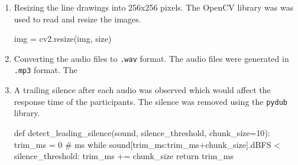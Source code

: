 \documentclass[
  a4paper,
]{article}
\newenvironment{Shaded}{}{}
\newcommand{\AttributeTok}[1]{\textcolor[rgb]{0.84,0.23,0.29}{#1}}
\newcommand{\CommentTok}[1]{\textcolor[rgb]{0.42,0.45,0.49}{#1}}
\newcommand{\ControlFlowTok}[1]{\textcolor[rgb]{0.84,0.23,0.29}{#1}}
\newcommand{\DecValTok}[1]{\textcolor[rgb]{0.00,0.36,0.77}{#1}}
\newcommand{\ExtensionTok}[1]{\textcolor[rgb]{0.84,0.23,0.29}{\textbf{#1}}}
\newcommand{\FunctionTok}[1]{\textcolor[rgb]{0.44,0.26,0.76}{#1}}
\newcommand{\KeywordTok}[1]{\textcolor[rgb]{0.84,0.23,0.29}{#1}}
\newcommand{\NormalTok}[1]{\textcolor[rgb]{0.14,0.16,0.18}{#1}}
\newcommand{\OperatorTok}[1]{\textcolor[rgb]{0.14,0.16,0.18}{#1}}
\newcommand{\PreprocessorTok}[1]{\textcolor[rgb]{0.84,0.23,0.29}{#1}}
\newcommand{\StringTok}[1]{\textcolor[rgb]{0.01,0.18,0.38}{#1}}
\newcommand{\VariableTok}[1]{\textcolor[rgb]{0.89,0.38,0.04}{#1}}
\begin{document}
\begin{enumerate}
\def\labelenumi{\arabic{enumi}.}
\item
  Resizing the line drawings into 256x256 pixels. The OpenCV library was
  was used to read and resize the images.

\begin{Shaded}
\begin{Highlighting}[]
\NormalTok{img }\OperatorTok{=}\NormalTok{ cv2.resize(img, size)}
\end{Highlighting}
\end{Shaded}
\item
  Converting the audio files to \texttt{.wav} format. The audio files
  were generated in \texttt{.mp3} format. The

\begin{Shaded}
\end{Shaded}
\item
  A trailing silence after each audio was observed which would affect
  the response time of the participants. The silence was removed using
  the \texttt{pydub} library.

\begin{Shaded}
\begin{Highlighting}[]
    \KeywordTok{def}\NormalTok{ detect\_leading\_silence(sound, silence\_threshold, chunk\_size}\OperatorTok{=}\DecValTok{10}\NormalTok{):}
\NormalTok{        trim\_ms }\OperatorTok{=} \DecValTok{0} \CommentTok{\# ms}
        \ControlFlowTok{while}\NormalTok{ sound[trim\_ms:trim\_ms}\OperatorTok{+}\NormalTok{chunk\_size].dBFS }\OperatorTok{\textless{}}\NormalTok{ silence\_threshold:}
\NormalTok{            trim\_ms }\OperatorTok{+=}\NormalTok{ chunk\_size}
        \ControlFlowTok{return}\NormalTok{ trim\_ms}
\end{Highlighting}
\end{Shaded}


\end{enumerate}
\end{document}
